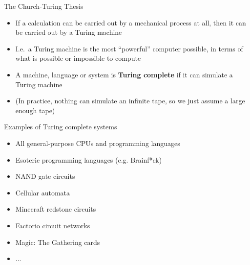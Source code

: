 \begin{frame}{The Church-Turing Thesis}
    \begin{itemize}
        \pause\item If a calculation can be carried out by a mechanical process at all,
            then it can be carried out by a Turing machine
        \pause\item I.e.\ a Turing machine is the most ``powerful'' computer possible,
            in terms of what is possible or impossible to compute
        \pause\item A machine, language or system is \textbf{Turing complete} if it can simulate a Turing machine
        \pause\item (In practice, nothing can simulate an infinite tape, so we just assume a large enough tape)
    \end{itemize}
\end{frame}

\begin{frame}{Examples of Turing complete systems}
    \begin{itemize}
        \pause\item All general-purpose CPUs and programming languages
        \pause\item Esoteric programming languages (e.g. Brainf*ck)
        \pause\item NAND gate circuits
        \pause\item Cellular automata
        \pause\item Minecraft redstone circuits
        \pause\item Factorio circuit networks
        \pause\item Magic: The Gathering cards
        \pause\item ...
    \end{itemize}
\end{frame}

